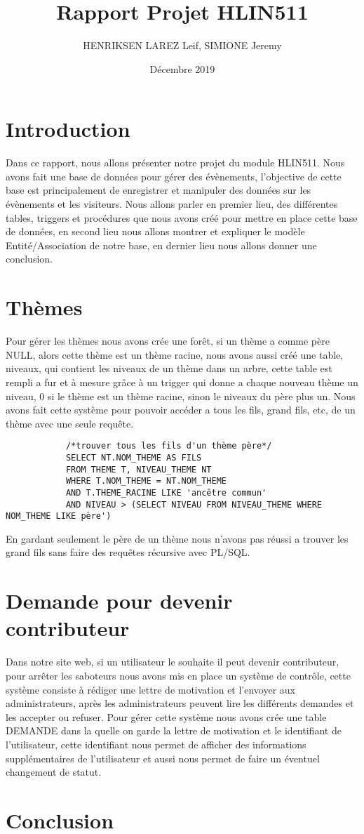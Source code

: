 \documentclass[french]{article}
\title{Rapport Projet HLIN511}
\author{HENRIKSEN LAREZ Leif, SIMIONE Jeremy}
\date{Décembre 2019}
\begin{document}
    \begin{titlepage}
        \clearpage\maketitle
        \thispagestyle{empty}
    \end{titlepage}
    \newpage
        \tableofcontents
    \newpage
        \section{Introduction}
            Dans ce rapport, nous allons présenter notre projet du module HLIN511. Nous avons fait une base de données pour gérer des évènements, l'objective de cette base est principalement de enregistrer et manipuler des données sur les évènements et les visiteurs. Nous allons parler en premier lieu, des différentes tables, triggers et procédures que nous avons créé pour mettre en place cette base de données, en second lieu nous allons montrer et expliquer le modèle Entité/Association de notre base, en dernier lieu nous allons donner une conclusion.
    \newpage
    \section{Thèmes}
        Pour gérer les thèmes nous avons crée une forêt, si un thème a comme père NULL, alors cette thème est un thème racine, nous avons aussi créé une table, niveaux, qui contient les niveaux de un thème dans un arbre, cette table est rempli a fur et à mesure grâce à un trigger qui donne a chaque nouveau thème un niveau, 0 si le thème est un thème racine, sinon le niveaux du père plus un. Nous avons fait cette système pour pouvoir accéder a tous les fils, grand fils, etc, de un thème avec une seule requête. 
        \begin{verbatim}
            /*trouver tous les fils d'un thème père*/
            SELECT NT.NOM_THEME AS FILS
            FROM THEME T, NIVEAU_THEME NT
            WHERE T.NOM_THEME = NT.NOM_THEME
            AND T.THEME_RACINE LIKE 'ancêtre commun'
            AND NIVEAU > (SELECT NIVEAU FROM NIVEAU_THEME WHERE NOM_THEME LIKE père')
        \end{verbatim}
        En gardant seulement le père de un thème nous n'avons pas réussi a trouver les grand fils sans faire des requêtes récursive avec PL/SQL. 
    \section{Demande pour devenir contributeur}
        Dans notre site web, si un utilisateur le souhaite il peut devenir contributeur, pour arrêter les saboteurs nous avons mis en place un système de contrôle, cette système consiste à rédiger une lettre de motivation et l'envoyer aux administrateurs, après les administrateurs peuvent lire les différents demandes et les accepter ou refuser. Pour gérer cette système nous avons crée une table DEMANDE dans la quelle on garde la lettre de motivation et le identifiant de l'utilisateur, cette identifiant nous permet de afficher des informations supplémentaires de l'utilisateur et aussi nous permet de faire un éventuel changement de statut.
    \section{Conclusion}
\end{document}
